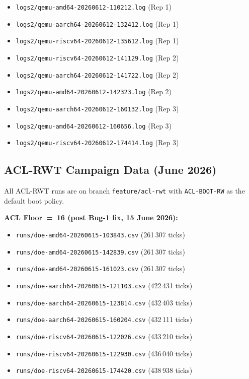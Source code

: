 \documentclass[10pt,a4paper]{article}
\begin{document}
\begin{itemize}[noitemsep]
  \item \texttt{logs2/qemu-amd64-20260612-110212.log}   (Rep 1)
  \item \texttt{logs2/qemu-aarch64-20260612-132412.log} (Rep 1)
  \item \texttt{logs2/qemu-riscv64-20260612-135612.log} (Rep 1)
  \item \texttt{logs2/qemu-riscv64-20260612-141129.log} (Rep 2)
  \item \texttt{logs2/qemu-aarch64-20260612-141722.log} (Rep 2)
  \item \texttt{logs2/qemu-amd64-20260612-142323.log}   (Rep 2)
  \item \texttt{logs2/qemu-aarch64-20260612-160132.log} (Rep 3)
  \item \texttt{logs2/qemu-amd64-20260612-160656.log}   (Rep 3)
  \item \texttt{logs2/qemu-riscv64-20260612-174414.log} (Rep 3)
\end{itemize}

\subsection{ACL-RWT Campaign Data (June 2026)}
\label{app:acl_data}

All ACL-RWT runs are on branch \texttt{feature/acl-rwt} with
\texttt{ACL-BOOT-RW} as the default boot policy.

\noindent\textbf{ACL Floor~=~16 (post Bug-1 fix, 15 June 2026):}
\begin{itemize}[noitemsep]
  \item \texttt{runs/doe-amd64-20260615-103843.csv}   \quad (261\,307 ticks)
  \item \texttt{runs/doe-amd64-20260615-142839.csv}   \quad (261\,307 ticks)
  \item \texttt{runs/doe-amd64-20260615-161023.csv}   \quad (261\,307 ticks)
  \item \texttt{runs/doe-aarch64-20260615-121103.csv} \quad (422\,431 ticks)
  \item \texttt{runs/doe-aarch64-20260615-123814.csv} \quad (432\,403 ticks)
  \item \texttt{runs/doe-aarch64-20260615-160204.csv} \quad (432\,111 ticks)
  \item \texttt{runs/doe-riscv64-20260615-122026.csv} \quad (433\,210 ticks)
  \item \texttt{runs/doe-riscv64-20260615-122930.csv} \quad (436\,040 ticks)
  \item \texttt{runs/doe-riscv64-20260615-174420.csv} \quad (438\,938 ticks)
\end{itemize}
\end{document}
